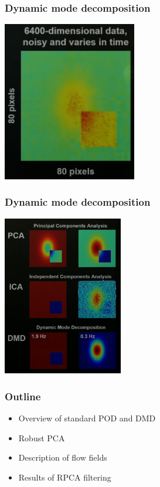 \documentclass[12pt]{beamer}
\begin{document}
\begin{frame} 
	\frametitle{Dynamic mode decomposition}
	\begin{center}
\includegraphics[height=7cm]{./figures/fig1.png}
	\end{center}

\end{frame}


\begin{frame} 
	\frametitle{Dynamic mode decomposition}
	\begin{center}
		\includegraphics[height=7cm]{./figures/fig2.png}
	\end{center}
	
\end{frame}

	\begin{frame}
	\frametitle{Outline}
	\begin{itemize}
		\item Overview of standard POD and DMD
		\item {\color{red}Robust PCA}
		\item Description of flow fields
		\item Results of RPCA filtering
	\end{itemize}
\end{frame}
\end{document}
